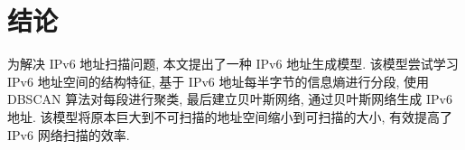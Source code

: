 \chapter{结论}
\label{cha:conclusion}

为解决 IPv6 地址扫描问题, 本文提出了一种 IPv6 地址生成模型. 该模型尝试学习 IPv6 地址空间的结构特征, 基于 IPv6 地址每半字节的信息熵进行分段, 使用 DBSCAN 算法对每段进行聚类, 最后建立贝叶斯网络, 通过贝叶斯网络生成 IPv6 地址. 该模型将原本巨大到不可扫描的地址空间缩小到可扫描的大小, 有效提高了 IPv6 网络扫描的效率.

